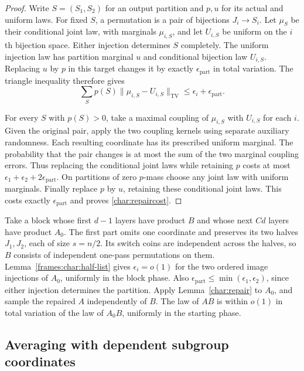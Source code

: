 \begin{proof}
Write $S=(S_1,S_2)$ for an output partition and $p,u$ for its actual
and uniform laws. For fixed $S$, a permutation is a pair of bijections
$J_i\to S_i$. Let $\mu_S$ be their conditional joint law, with marginals
$\mu_{i,S}$, and let $U_{i,S}$ be uniform on the $i$th bijection space.
Either injection determines $S$ completely. The uniform injection law
has partition marginal $u$ and conditional bijection law $U_{i,S}$.
Replacing $u$ by $p$ in this target changes it by exactly
$\epsilon_{\mathrm{part}}$ in total variation. The triangle inequality
therefore gives
\[
 \sum_Sp(S)\|\mu_{i,S}-U_{i,S}\|_{\mathrm{TV}}
 \le\epsilon_i+\epsilon_{\mathrm{part}}.
\]

For every $S$ with $p(S)>0$, take a maximal coupling of $\mu_{i,S}$
with $U_{i,S}$ for each $i$. Given the original pair, apply the two
coupling kernels using separate auxiliary randomness. Each resulting
coordinate has its prescribed uniform marginal. The probability that
the pair changes is at most the sum of the two marginal coupling
errors. Thus replacing the conditional joint laws while retaining $p$
costs at most
$\epsilon_1+\epsilon_2+2\epsilon_{\mathrm{part}}$.
On partitions of zero $p$-mass choose any joint law with uniform
marginals. Finally replace $p$ by $u$, retaining these conditional
joint laws. This costs exactly $\epsilon_{\mathrm{part}}$ and proves
\eqref{char:repaircost}.
\end{proof}

Take a block whose first $d-1$ layers have product $B$ and whose next
$Cd$ layers have product $A_0$. The first part omits one coordinate
and preserves its two halves $J_1,J_2$, each of size $s=n/2$.
Its switch coins are independent across the halves, so $B$ consists
of independent one-pass permutations on them.
Lemma~\ref{frames:char:half-list} gives $\epsilon_i=o(1)$ for the two
ordered image injections of $A_0$, uniformly in the block phase. Also
$\epsilon_{\mathrm{part}}\le\min(\epsilon_1,\epsilon_2)$, since either
injection determines the partition. Apply Lemma~\ref{char:repair} to
$A_0$, and sample the repaired $A$ independently of $B$. The law of
$AB$ is within $o(1)$ in total variation of the law of $A_0B$,
uniformly in the starting phase.

\subsection{Averaging with dependent subgroup coordinates}

